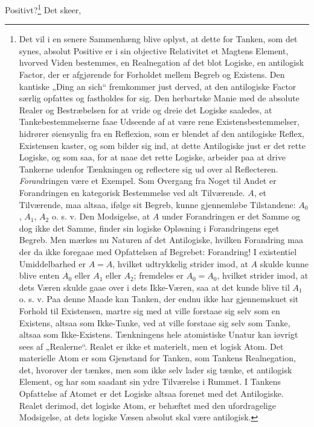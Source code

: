 \documentclass[11pt]{book}
\newcommand{\opage}[1]{\marginnote{\footnotesize\textit{[#1]}}}
\begin{document}
Positivt?\footnote{Det vil i en senere Sammenhæng blive oplyst, at
dette for Tanken, som det synes, absolut Positive er i sin objective
Relativitet et Magtens Element, hvorved Viden bestemmes, en
Realnegation af det blot Logiske, en antilogisk Factor, der er
afgjørende for Forholdet mellem Begreb og Existens. Den kantiske
„Ding an sich“ fremkommer just derved, at den antilogiske Factor
særlig opfattes og fastholdes for sig. Den herbartske Manie med de
absolute Realer og Bestræbelsen for at vride og dreie det Logiske
saaledes, at Tankebestemmelserne faae Udseende af at være rene
Existensbestemmelser, hidrører øiensynlig fra en Reflexion, som er
blendet af den antilogiske Reflex, Existensen kaster, og som bilder
sig ind, at dette Antilogiske just er det rette Logiske, og som saa,
for at naae det rette Logiske, arbeider paa at drive Tankerne udenfor
Tænkningen og reflectere sig ud over al Reflecteren. \emph{Foran}dringen
være et Exempel. Som Overgang fra Noget til Andet er Forandringen en
kategorisk Bestemmelse ved alt Tilværende. $A$, et Tilværende, maa
altsaa, ifølge sit Begreb, kunne gjennemløbe Tilstandene: $A_0$,
$A_1$, $A_2$ o. s. v. Den Modsigelse, at $A$ under Forandringen er
det Samme og dog ikke det Samme, finder sin logiske Opløsning i
Forandringens eget Begreb. Men mærkes nu Naturen af det Antilogiske,
hvilken Forandring maa der da ikke foregaae med Opfattelsen af
Begrebet: Forandring! I existentiel Umiddelbarhed er $A = A$, hvilket
udtrykkelig strider imod, at $A$ skulde kunne blive enten $A_0$ eller
$A_1$ eller $A_2$; fremdeles er $A_0 = A_0$, hvilket strider imod, at
dets Væren skulde gaae over i dets Ikke-Væren, saa at det kunde blive
til $A_1$ o. s. v. Paa denne Maade kan Tanken, der endnu ikke har
gjennemskuet sit Forhold til Existensen, martre sig med at ville
forstaae sig selv som en Existens, altsaa som Ikke-Tanke, ved at
ville forstaae sig selv som Tanke, altsaa som Ikke-Existens.
Tænkningens hele atomistiske Unatur kan iøvrigt sees af „Realerne“.
Realet er ikke et materielt, men et logisk Atom. Det materielle Atom
er som Gjenstand for Tanken, som Tankens Realnegation, det, hvorover
der tænkes, men som ikke selv lader sig tænke, et antilogisk Element,
og har som saadant sin ydre Tilværelse i Rummet. I Tankens Opfattelse
af Atomet er det Logiske altsaa forenet med det Antilogiske. Realet
derimod, det logiske Atom, er behæftet med den ufordragelige
Modsigelse, at dets logiske Væsen absolut skal være antilogisk.} Det
skeer,
\opage{17} \setcounter{footnote}{0}%
\end{document}
